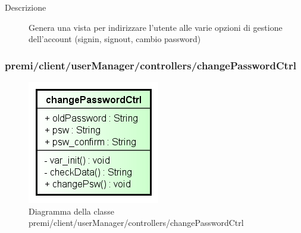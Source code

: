 \begin{description}
\item[Descrizione] \hfill
	Genera una vista per indirizzare l'utente alle varie opzioni di gestione dell'account (signin, signout, cambio password)
\end{description}

















\subsubsection{premi/client/userManager/controllers/changePasswordCtrl}
\begin{figure}[h]
\begin{center}
\includegraphics[scale=0.55]{img/diacla/changePasswordCtrl.png}
\caption{Diagramma della classe premi/client/userManager/controllers/changePasswordCtrl}
\end{center}
\end{figure}


